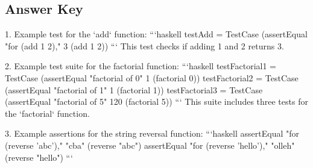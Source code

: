\documentclass{article}
\begin{document}
\subsection*{Answer Key}
1. Example test for the `add` function:
   ```haskell
   testAdd = TestCase (assertEqual "for (add 1 2)," 3 (add 1 2))
   ```
   This test checks if adding 1 and 2 returns 3.

2. Example test suite for the factorial function:
   ```haskell
   testFactorial1 = TestCase (assertEqual "factorial of 0" 1 (factorial 0))
   testFactorial2 = TestCase (assertEqual "factorial of 1" 1 (factorial 1))
   testFactorial3 = TestCase (assertEqual "factorial of 5" 120 (factorial 5))
   ```
   This suite includes three tests for the `factorial` function.

3. Example assertions for the string reversal function:
   ```haskell
   assertEqual "for (reverse 'abc')," "cba" (reverse "abc")
   assertEqual "for (reverse 'hello')," "olleh" (reverse "hello")
   ```
\end{document}
